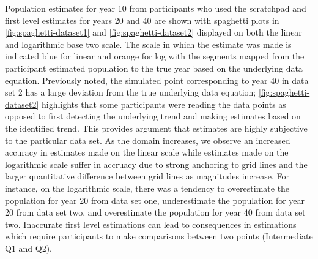 \documentclass[print]{nuthesis}
\begin{document}
Population estimates for year 10 from participants who used the scratchpad and first level estimates for years 20 and 40 are shown with spaghetti plots in \cref{fig:spaghetti-dataset1} and \cref{fig:spaghetti-dataset2} displayed on both the linear and logarithmic base two scale.
The scale in which the estimate was made is indicated blue for linear and orange for log with the segments mapped from the participant estimated population to the true year based on the underlying data equation.
Previously noted, the simulated point corresponding to year 40 in data set 2 has a large deviation from the true underlying data equation; \cref{fig:spaghetti-dataset2} highlights that some participants were reading the data points as opposed to first detecting the underlying trend and making estimates based on the identified trend.
This provides argument that estimates are highly subjective to the particular data set.
As the domain increases, we observe an increased accuracy in estimates made on the linear scale while estimates made on the logarithmic scale suffer in accruacy due to strong anchoring to grid lines and the larger quantitative difference between grid lines as magnitudes increase.
For instance, on the logarithmic scale, there was a tendency to overestimate the population for year 20 from data set one, underestimate the population for year 20 from data set two, and overestimate the population for year 40 from data set two.
Inaccurate first level estimations can lead to consequences in estimations which require participants to make comparisons between two points (Intermediate Q1 and Q2).
\end{document}
